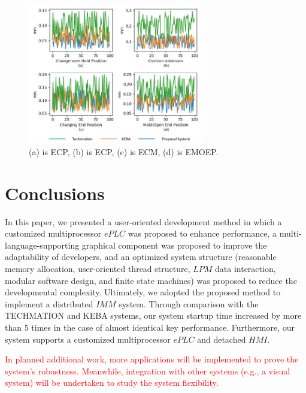 \documentclass[journal,UTF8]{IEEEtran}
\begin{document}
		\begin{figure}
		\centering
		\includegraphics[width=3in]{fig/Compare.pdf}
		\caption{(a) is ECP, (b) is ECP, (c) is ECM, (d) is EMOEP.}
		\label{fig:Compare}
	\end{figure}

	\section{Conclusions}
	\label{conclusion}
	In this paper, we presented a user-oriented development method in which a customized multiprocessor $ePLC$ was proposed to enhance performance, a multi-language-supporting graphical component was proposed to improve the adaptability of developers, and an optimized system structure (reasonable memory allocation, user-oriented thread structure, $LPM$ data interaction, modular software design, and finite state machines) was proposed to reduce the developmental complexity. Ultimately, we adopted the proposed method to implement a distributed $IMM$ system. Through comparison with the TECHMATION and KEBA systems, our system startup time increased by more than 5 times in the case of almost identical key performance. Furthermore, our system supports a customized multiprocessor $ePLC$ and detached $HMI$. 
	
	\textcolor{red}{In planned additional work, more applications will be implemented to prove the system's robustness. Meanwhile, integration with other systems (e.g., a visual system) will be undertaken to study the system flexibility.} 
	
	
	
	
	
	\ifCLASSOPTIONcaptionsoff
	\newpage
	\fi
	
	
	
	
\end{document}
